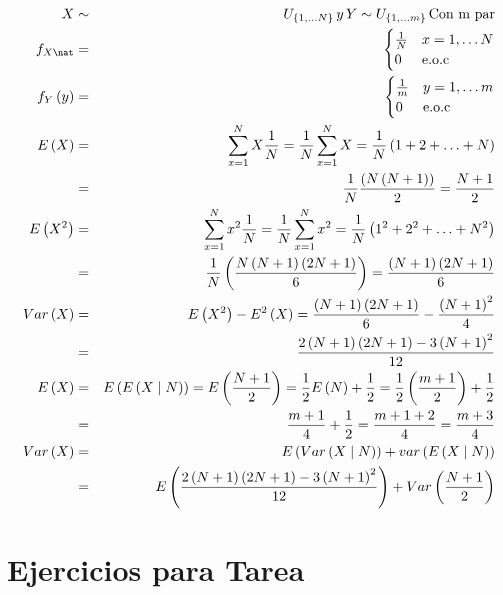 \begin{enumerate}
\begin{eqnarray*}
X &\sim & U_{ \left\{ 1, \ldots N   \right\}  } \, y \, Y\sim U_{ \left\{ 1, \ldots m    \right\}  } \,  \textrm{Con m par}\\
f_{X\nat}&=&\begin{cases}
\frac{1}{N} & x= 1, \ldots N \\
0 & \textrm{e.o.c}
\end{cases}\\
f_{Y}\left(y \right)&=&\begin{cases}
\frac{1}{m} & y= 1, \ldots m \\
0 & \textrm{e.o.c}
\end{cases}\\
E \left(X \right)&=& \sum_{x=1}^{N} X \frac{1}{N}= \frac{1}{N}\sum_{x=1}^{N} X = \frac{1}{N}\left(1+2+\ldots + N \right)\\
&=& \frac{1}{N} \dfrac{\left(N \left(N+1\right)\right)}{2}= \frac{N+1}{2}\\
E \left(X^{2}\right)&=& \sum_{x=1}^{N} x^{2}\frac{1}{N}= \frac{1}{N} \sum_{x=1}^{N} x^{2}= \frac{1}{N} \left( 1^2+2^2+ \ldots+ N^2 \right)\\
&=& \frac{1}{N} \left( \dfrac{N \left(N+1\right)\left(2N+1\right)}{6} \right)= \dfrac{\left(N+1\right)\left(2N+1\right)}{6}\\
Var\left(X\right)&=& E \left(X^2\right)- E^2\left(X\right)= \dfrac{\left(N+1\right)\left(2N+1\right)}{6}- \dfrac{\left(N+1\right)^2}{4}\\
&=&\dfrac{2\left(N+1\right)\left(2N+1\right)-3\left(N+1\right)^2}{12}\\
E\left(X\right)&=& E \left(E\left(X\mid N \right)\right)= E \left(\frac{N+1}{2} \right)= \frac{1}{2} E \left(N \right)+ \frac{1}{2}= \frac{1}{2}\left( \frac{m+1}{2} \right)+\frac{1}{2}\\
&=& \frac{m+1}{4} + \frac{1}{2}= \frac{m+1+2}{4}= \frac{m+3}{4}\\
Var \left(X \right)&=& E\left(Var \left(X \mid N \right) \right)+ var \left(E \left(X \mid N \right) \right)\\
&=& E \left(\dfrac{2\left(N+1\right)\left(2N+1\right)-3\left(N+1\right)^2}{12} \right)  + Var \left(\frac{N+1}{2} \right)
\end{eqnarray*}

\end{enumerate}

\section{Ejercicios para Tarea}

